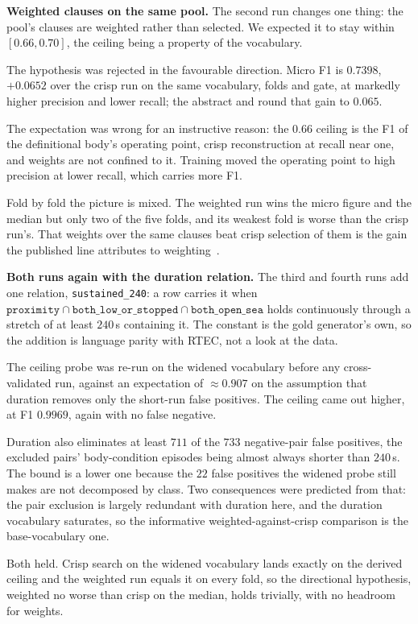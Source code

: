 \textbf{Weighted clauses on the same pool.} The second run changes one thing: the pool's clauses are weighted rather than selected. We expected it to stay within $[0.66, 0.70]$, the ceiling being a property of the vocabulary.

The hypothesis was rejected in the favourable direction. Micro F1 is $\mathbf{0.7398}$, $+0.0652$ over the crisp run on the same vocabulary, folds and gate, at markedly higher precision and lower recall; the abstract and  round that gain to $0.065$.

The expectation was wrong for an instructive reason: the $0.66$ ceiling is the F1 of the definitional body's operating point, crisp reconstruction at recall near one, and weights are not confined to it. Training moved the operating point to high precision at lower recall, which carries more F1.

Fold by fold the picture is mixed. The weighted run wins the micro figure and the median but only two of the five folds, and its weakest fold is worse than the crisp run's. That weights over the same clauses beat crisp selection of them is the gain the published line attributes to weighting~\cite{woled}.

\textbf{Both runs again with the duration relation.} The third and fourth runs add one relation, \texttt{sustained\_240}: a row carries it when $\texttt{proximity}\cap\texttt{both\_low\_or\_stopped}\cap\texttt{both\_open\_sea}$ holds continuously through a stretch of at least $240$\,s containing it. The constant is the gold generator's own, so the addition is language parity with RTEC, not a look at the data.

The ceiling probe was re-run on the widened vocabulary before any cross-validated run, against an expectation of ${\approx}0.907$ on the assumption that duration removes only the short-run false positives. The ceiling came out higher, at F1 $0.9969$, again with no false negative.

Duration also eliminates at least $711$ of the $733$ negative-pair false positives, the excluded pairs' body-condition episodes being almost always shorter than $240$\,s. The bound is a lower one because the $22$ false positives the widened probe still makes are not decomposed by class. Two consequences were predicted from that: the pair exclusion is largely redundant with duration here, and the duration vocabulary saturates, so the informative weighted-against-crisp comparison is the base-vocabulary one.

Both held. Crisp search on the widened vocabulary lands exactly on the derived ceiling and the weighted run equals it on every fold, so the directional hypothesis, weighted no worse than crisp on the median, holds trivially, with no headroom for weights.

